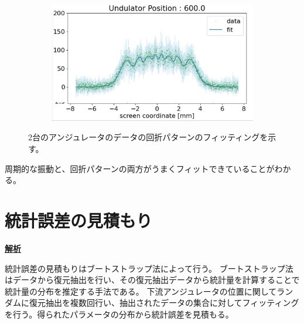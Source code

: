 \documentclass[a4paper,11pt,uplatex]{jsbook}
\begin{document}
\begin{figure}
\begin{subfigure}[h]{0.45\linewidth}
  \end{subfigure}
  \begin{subfigure}[h]{0.45\linewidth}
    \centering
    \includegraphics[width=\linewidth]{image/4-double_600.png}
  \end{subfigure}
  \caption[2台のアンジュレータのデータ]{2台のアンジュレータのデータの回折パターンのフィッティングを示す。}
\end{figure}\label{double}

周期的な振動と、回折パターンの両方がうまくフィットできていることがわかる。

\section{統計誤差の見積もり}
\noindent \textbf{\underline{解析}}\par
統計誤差の見積もりはブートストラップ法によって行う。
ブートストラップ法はデータから復元抽出を行い、その復元抽出データから統計量を計算することで統計量の分布を推定する手法である。
下流アンジュレータの位置に関してランダムに復元抽出を複数回行い、抽出されたデータの集合に対してフィッティングを行う。得られたパラメータの分布から統計誤差を見積もる。

\end{document}
